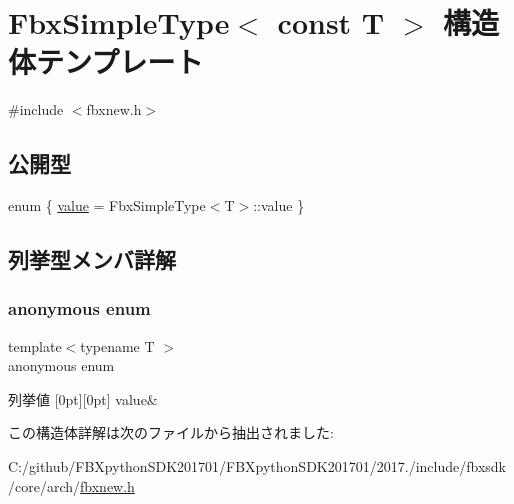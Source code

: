 \hypertarget{struct_fbx_simple_type_3_01const_01_t_01_4}{}\section{Fbx\+Simple\+Type$<$ const T $>$ 構造体テンプレート}
\label{struct_fbx_simple_type_3_01const_01_t_01_4}


{\ttfamily \#include $<$fbxnew.\+h$>$}

\subsection*{公開型}
\begin{DoxyCompactItemize}
\item 
enum \{ \hyperlink{struct_fbx_simple_type_3_01const_01_t_01_4_ac98b2314bdb5ea5924a3b67466977c73a70a474048a59b9fb1f5d7f4f743ea6ef}{value} = Fbx\+Simple\+Type$<$T$>$\+:\+:value
 \}
\end{DoxyCompactItemize}


\subsection{列挙型メンバ詳解}
\mbox{\label{struct_fbx_simple_type_3_01const_01_t_01_4_ac98b2314bdb5ea5924a3b67466977c73}} 
\subsubsection{\texorpdfstring{anonymous enum}{anonymous enum}}
{\footnotesize\ttfamily template$<$typename T $>$ \\
anonymous enum}

\begin{DoxyEnumFields}{列挙値}
[0pt][0pt]{}\mbox{\label{struct_fbx_simple_type_3_01const_01_t_01_4_ac98b2314bdb5ea5924a3b67466977c73a70a474048a59b9fb1f5d7f4f743ea6ef}} 
value&\\
\hline

\end{DoxyEnumFields}


この構造体詳解は次のファイルから抽出されました\+:\begin{DoxyCompactItemize}
\item 
C\+:/github/\+F\+B\+Xpython\+S\+D\+K201701/\+F\+B\+Xpython\+S\+D\+K201701/2017./include/fbxsdk/core/arch/\hyperlink{fbxnew_8h}{fbxnew.\+h}\end{DoxyCompactItemize}
